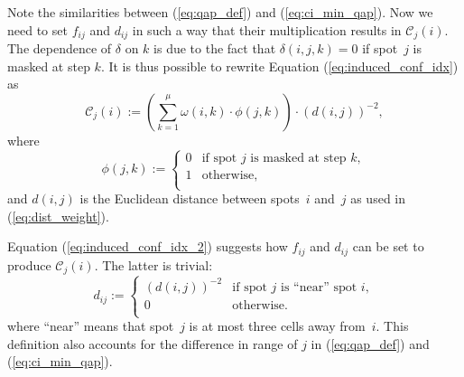 \documentclass{bioinfo}
\begin{document}
Note the similarities between (\ref{eq:qap_def}) and (\ref{eq:ci_min_qap}). Now we need to set $f_{ij}$ and $d_{ij}$ in such a way that their multiplication results in $\mathcal{C}_{j}(i)$. The dependence of $\delta$ on $k$ is due to the fact that $\delta(i,j,k) = 0$ if spot~$j$ is masked at step $k$. It is thus possible to rewrite Equation (\ref{eq:induced_conf_idx}) as
\begin{equation}
\label{eq:induced_conf_idx_2}
\mathcal{C}_{j}(i) := \left( \sum_{k=1}^{\mu} \omega(i,k) \cdot \phi(j,k) \right) \cdot (d(i,j))^{-2},
\end{equation}
where
\begin{equation}
\phi(j,k) :=
        \left\{
                \begin{array}{ll}
                        0 & \mbox{if spot $j$ is masked at step $k$}, \\
                        1 & \mbox{otherwise}, \\
                \end{array}
        \right.
\end{equation}
and $d(i,j)$ is the Euclidean distance between spots~$i$ and~$j$ as used in (\ref{eq:dist_weight}).

Equation (\ref{eq:induced_conf_idx_2}) suggests how $f_{ij}$ and $d_{ij}$ can be set to produce $\mathcal{C}_j(i)$. The latter is trivial:
\begin{equation}
d_{ij} :=
	\left\{
                \begin{array}{ll}
                        (d(i,j))^{-2} & \mbox{if spot $j$ is ``near'' spot $i$}, \\
                        0 & \mbox{otherwise}. \\
                \end{array}
	\right.
\end{equation}
where ``near'' means that spot~$j$ is at most three cells away from~$i$. This definition also accounts for the difference in range of $j$ in (\ref{eq:qap_def}) and (\ref{eq:ci_min_qap}).
\end{document}
